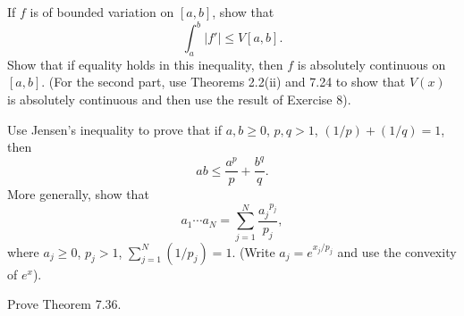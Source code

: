 \begin{problem}
  If $f$ is of bounded variation on $[a,b]$, show that
  \[
    \int_a^b|f'|\leq V[a,b].
  \]
  Show that if equality holds in this inequality, then $f$ is absolutely
  continuous on $[a,b]$. (For the second part, use Theorems 2.2(ii) and
  7.24 to show that $V(x)$ is absolutely continuous and then use the result
  of Exercise 8).
\end{problem}
\begin{solution}
\end{solution}

\begin{problem}
  Use Jensen's inequality to prove that if $a,b\geq 0$, $p,q>1$,
  $(1/p)+(1/q)=1$, then
  \[
    ab\leq\frac{a^p}{p}+\frac{b^q}{q}.
  \]
  More generally, show that
  \[
    a_1\dotsm a_N=\sum_{j=1}^N\frac{{a_j}^{p_j}}{p_j},
  \]
  where $a_j\geq 0$, $p_j>1$, $\sum_{j=1}^N(1/p_j)=1$. (Write
  $a_j=e^{x_j/p_j}$ and use the convexity of $e^x$).
\end{problem}
\begin{solution}
\end{solution}

\begin{problem}
  Prove Theorem 7.36.
\end{problem}

